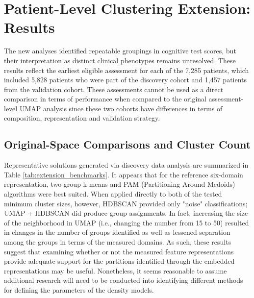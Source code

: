 \section{Patient-Level Clustering Extension: Results}\label{sec:extension_results}

The new analyses identified repeatable groupings in cognitive test scores, but their interpretation as distinct clinical phenotypes remains unresolved. These results reflect the earliest eligible assessment for each of the 7,285 patients, which included 5,828 patients who were part of the discovery cohort and 1,457 patients from the validation cohort. These assessments cannot be used as a direct comparison in terms of performance when compared to the original assessment-level UMAP analysis since these two cohorts have differences in terms of composition, representation and validation strategy.

\subsection{Original-Space Comparisons and Cluster Count}

Representative solutions generated via discovery data analysis are summarized in Table \ref{tab:extension_benchmarks}. It appears that for the reference six-domain representation, two-group k-means and PAM (Partitioning Around Medoids) algorithms were best suited. When applied directly to both of the tested minimum cluster sizes, however, HDBSCAN provided only "noise" classifications; UMAP + HDBSCAN did produce group assignments. In fact, increasing the size of the neighborhood in UMAP (i.e., changing the number from 15 to 50) resulted in changes in the number of groups identified as well as lessened separation among the groups in terms of the measured domains. As such, these results suggest that examining whether or not the measured feature representations provide adequate support for the partitions identified through the embedded representations may be useful. Nonetheless, it seems reasonable to assume additional research will need to be conducted into identifying different methods for defining the parameters of the density models.

